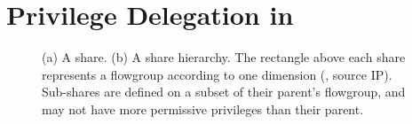 \begin{landscape}

\end{landscape}

\chapter{Privilege Delegation in \sys}
\label{sec:delegation}

\begin{figure}[t]
\centering
{}\hfill
{}
\caption{(a) A \sys share. (b) A share
hierarchy. The rectangle above each share represents a flowgroup
according to one dimension (\eg, source IP). Sub-shares are defined
on a subset of their parent's flowgroup, and may not have more permissive
privileges than their parent.}
\label{fig:shares}
\end{figure}


